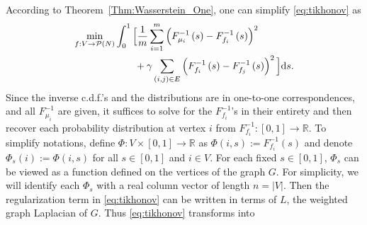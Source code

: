 \documentclass[letterpaper]{article} %
\begin{document}
According to Theorem~\ref{Thm:Wasserstein_One}, one can simplify \eqref{eq:tikhonov} as 
\begin{equation*}
  \begin{aligned}
    \min_{f:V\to \P(N)}&\int_0^1 \Big[ \frac{1}{m} \sum_{i=1}^m \left(F_{\mu_i}^{-1}\left( s \right)-F_{f_i}^{-1}\left( s \right)\right)^2\\
    &\qquad +\gamma \sum_{\left( i,j \right)\in E}\left( F_{f_i}^{-1}\left( s \right)-F_{f_j}^{-1}\left( s \right) \right)^2  \Big]\mathrm{d}s.
  \end{aligned}
  \end{equation*}
Since the inverse c.d.f.'s and the distributions are in one-to-one correspondences, and all $F_{\mu_i}^{-1}$ are given, it suffices to solve for the $F_{f_i}^{-1}$'s in their entirety and then recover each probability distribution at vertex $i$ from $F_{f_i}^{-1}:[0,1]\rightarrow\mathbb{R}$. To simplify notations, define $\Phi:V\times \left[ 0,1 \right]\rightarrow \mathbb{R}$ as $\Phi\left( i,s \right):=F_{f_i}^{-1}\left( s \right)$
and denote $\Phi_s \left( i \right):=\Phi \left( i,s \right)$ for all $s\in \left[ 0,1 \right]$ and $i\in V$.
For each fixed $s\in\left[0,1\right]$, $\Phi_s$ can be viewed as a function defined on the vertices of the graph $G$. For simplicity, we will identify each $\Phi_s$ with a real column vector of length $n=\left| V \right|$. 
Then the regularization term in \eqref{eq:tikhonov} can be written in terms of $L$, the weighted graph Laplacian of $G$. Thus \eqref{eq:tikhonov} transforms into
\end{document}
